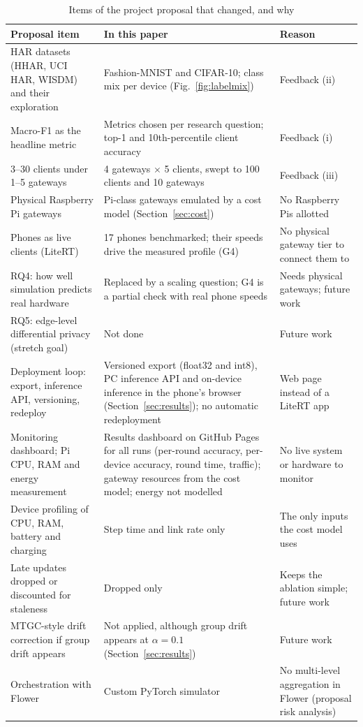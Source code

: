 \documentclass[conference]{IEEEtran}
\begin{document}
\begin{table}[t]
\centering
\caption{Items of the project proposal that changed, and why}
\label{tab:proposal}
\footnotesize
\renewcommand{\arraystretch}{1.08}
\begin{tabularx}{\textwidth}{@{}p{4.6cm}p{6.1cm}Y@{}}
\toprule
\textbf{Proposal item} & \textbf{In this paper} & \textbf{Reason} \\
\midrule
HAR datasets (HHAR, UCI HAR, WISDM) and their exploration & Fashion-MNIST and CIFAR-10; class mix per device (Fig.~\ref{fig:labelmix}) & Feedback (ii) \\
Macro-F1 as the headline metric & Metrics chosen per research question; top-1 and 10th-percentile client accuracy & Feedback (i) \\
3--30 clients under 1--5 gateways & 4 gateways $\times$ 5 clients, swept to 100 clients and 10 gateways & Feedback (iii) \\
Physical Raspberry Pi gateways & Pi-class gateways emulated by a cost model (Section~\ref{sec:cost}) & No Raspberry Pis allotted \\
Phones as live clients (LiteRT) & 17 phones benchmarked; their speeds drive the measured profile (G4) & No physical gateway tier to connect them to \\
RQ4: how well simulation predicts real hardware & Replaced by a scaling question; G4 is a partial check with real phone speeds & Needs physical gateways; future work \\
RQ5: edge-level differential privacy (stretch goal) & Not done & Future work \\
Deployment loop: export, inference API, versioning, redeploy & Versioned export (float32 and int8), PC inference API and on-device inference in the phone's browser (Section~\ref{sec:results}); no automatic redeployment & Web page instead of a LiteRT app \\
Monitoring dashboard; Pi CPU, RAM and energy measurement & Results dashboard on GitHub Pages for all runs (per-round accuracy, per-device accuracy, round time, traffic); gateway resources from the cost model; energy not modelled & No live system or hardware to monitor \\
Device profiling of CPU, RAM, battery and charging & Step time and link rate only & The only inputs the cost model uses \\
Late updates dropped or discounted for staleness & Dropped only & Keeps the ablation simple; future work \\
MTGC-style drift correction if group drift appears & Not applied, although group drift appears at $\alpha = 0.1$ (Section~\ref{sec:results}) & Future work \\
Orchestration with Flower & Custom PyTorch simulator & No multi-level aggregation in Flower (proposal risk analysis) \\
\bottomrule
\end{tabularx}
\end{table}
\end{document}
